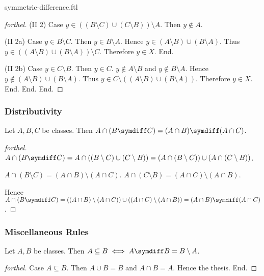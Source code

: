 \documentclass{naproche-library}
\begin{document}
\begin{smodule}{symmetric-difference.ftl}
\begin{proof}[forthel]
      (II 2) Case $y \in ((B \setminus C) \cup (C \setminus B)) \setminus A$.
        Then $y \notin A$.

        (II 2a) Case $y \in B \setminus C$.
          Then $y \in B \setminus A$.
          Hence $y \in (A \setminus B) \cup (B \setminus A)$.
          Thus $y \in ((A \setminus B) \cup (B \setminus A)) \setminus C$.
          Therefore $y \in X$.
        End.

        (II 2b) Case $y \in C \setminus B$.
          Then $y \in C$.
          $y \notin A \setminus B$ and $y \notin B \setminus A$.
          Hence $y \notin (A \setminus B) \cup (B \setminus A)$.
          Thus $y \in C \setminus ((A \setminus B) \cup (B \setminus A))$.
          Therefore $y \in X$.
        End.
      End.
    End.
  \end{proof}


  \subsubsection*{Distributivity}

  \begin{proposition}[forthel,id=FOUNDATIONS_03_4119141910839296]
    Let $A, B, C$ be classes.
    Then $A \cap (B \symdiff C) = (A \cap B) \symdiff (A \cap C)$.
  \end{proposition}
  \begin{proof}[forthel]
    $A \cap (B \symdiff C)
      = A \cap ((B \setminus C) \cup (C \setminus B))
      = (A \cap (B \setminus C)) \cup (A \cap (C \setminus B))$.

    $A \cap (B \setminus C) = (A \cap B) \setminus (A \cap C)$.
    $A \cap (C \setminus B) = (A \cap C) \setminus (A \cap B)$.

    Hence $A \cap (B \symdiff C)
      = ((A \cap B) \setminus (A \cap C)) \cup ((A \cap C) \setminus (A \cap B))
      = (A \cap B) \symdiff (A \cap C)$.
  \end{proof}


  \subsubsection*{Miscellaneous Rules}

  \begin{proposition}[forthel,id=FOUNDATIONS_03_7383417205293056]
    Let $A, B$ be classes.
    Then $A \subseteq B \iff A \symdiff B = B \setminus A$.
  \end{proposition}
  \begin{proof}[forthel]
    Case $A \subseteq B$.
      Then $A \cup B = B$ and $A \cap B = A$.
      Hence the thesis.
    End.


\end{proof}
\end{smodule}
\end{document}
